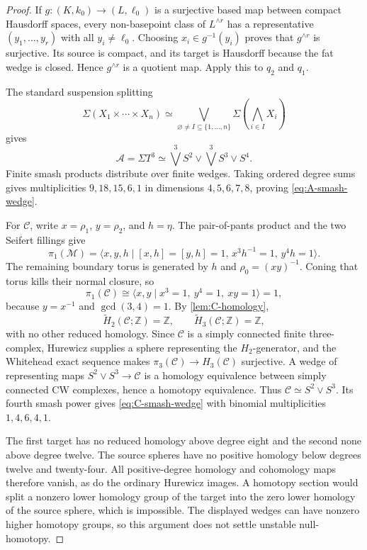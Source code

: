 \documentclass[11pt,letterpaper]{article}
\numberwithin{equation}{section}
\theoremstyle{definition}
\theoremstyle{remark}
\newcommand{\Z}{\mathbb Z}
\begin{document}
\begin{proof}
If \(g:(K,k_0)\to(L,\ell_0)\) is a surjective based map between compact
Hausdorff spaces, every non-basepoint class of \(L^{\wedge r}\) has a
representative \((y_1,\ldots,y_r)\) with all \(y_i\ne\ell_0\).  Choosing
\(x_i\in g^{-1}(y_i)\) proves that \(g^{\wedge r}\) is surjective.  Its
source is compact, and its target is Hausdorff because the fat wedge is
closed.  Hence \(g^{\wedge r}\) is a quotient map.  Apply this to
\(q_2\) and \(q_1\).

The standard suspension splitting
\[
 \Sigma(X_1\times\cdots\times X_n)
 \simeq
 \bigvee_{\varnothing\ne I\subseteq\{1,\ldots,n\}}
 \Sigma\!\left(\bigwedge_{i\in I}X_i\right)
\]
gives
\[
 \mathcal A=\Sigma T^3
 \simeq\bigvee^3S^2\vee\bigvee^3S^3\vee S^4.
\]
Finite smash products distribute over finite wedges.  Taking ordered
degree sums gives multiplicities \(9,18,15,6,1\) in dimensions
\(4,5,6,7,8\), proving \cref{eq:A-smash-wedge}.

For \(\mathcal C\), write \(x=\rho_1\), \(y=\rho_2\), and
\(h=\eta\).  The pair-of-pants product and the two Seifert fillings give
\[
 \pi_1(\mathcal M)=
 \langle x,y,h\mid[x,h]=[y,h]=1,\,
 x^3h^{-1}=1,\,y^4h=1\rangle.
\]
The remaining boundary torus is generated by \(h\) and
\(\rho_0=(xy)^{-1}\).  Coning that torus kills their normal closure, so
\[
 \pi_1(\mathcal C)
 \cong\langle x,y\mid x^3=1,\ y^4=1,\ xy=1\rangle=1,
\]
because \(y=x^{-1}\) and \(\gcd(3,4)=1\).  By
\cref{lem:C-homology},
\[
 \widetilde H_2(\mathcal C;\Z)=\Z,\qquad
 \widetilde H_3(\mathcal C;\Z)=\Z,
\]
with no other reduced homology.  Since \(\mathcal C\) is a simply
connected finite three-complex, Hurewicz supplies a sphere representing
the \(H_2\)-generator, and the Whitehead exact sequence makes
\(\pi_3(\mathcal C)\to H_3(\mathcal C)\) surjective.  A wedge of
representing maps \(S^2\vee S^3\to\mathcal C\) is a homology equivalence
between simply connected CW complexes, hence a homotopy equivalence.
Thus \(\mathcal C\simeq S^2\vee S^3\).  Its fourth smash power gives
\cref{eq:C-smash-wedge} with binomial multiplicities \(1,4,6,4,1\).

The first target has no reduced homology above degree eight and the
second none above degree twelve.  The source spheres have no positive
homology below degrees twelve and twenty-four.  All positive-degree
homology and cohomology maps therefore vanish, as do the ordinary
Hurewicz images.  A homotopy section would split a nonzero lower homology
group of the target into the zero lower homology of the source sphere,
which is impossible.  The displayed wedges can have nonzero higher
homotopy groups, so this argument does not settle unstable null-homotopy.
\end{proof}
\end{document}
